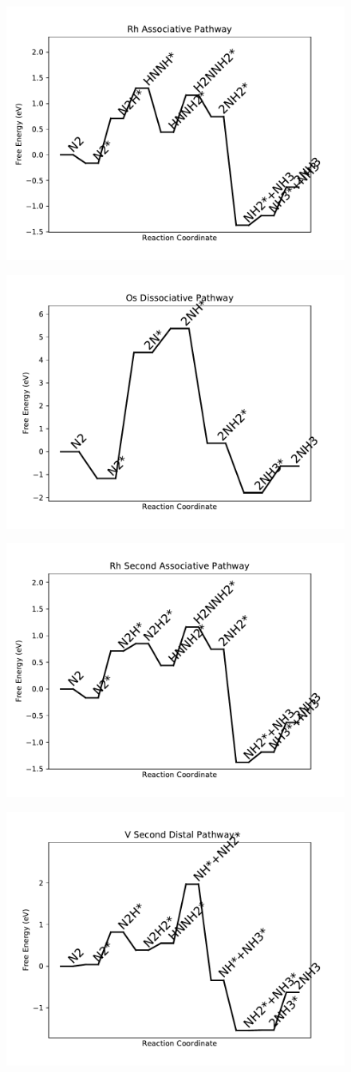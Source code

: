 \begin{figure}
\includegraphics[width=0.5\linewidth]{data/plots/Rh_associative.pdf}
\label{fig:Rh_associative}
\end{figure}

\begin{figure}
\includegraphics[width=0.5\linewidth]{data/plots/Os_dissociative.pdf}
\label{fig:Os_dissociative}
\end{figure}

\begin{figure}
\includegraphics[width=0.5\linewidth]{data/plots/Rh_associative_2.pdf}
\label{fig:Rh_associative_2}
\end{figure}

\begin{figure}
\includegraphics[width=0.5\linewidth]{data/plots/V_distal_2.pdf}
\label{fig:V_distal_2}
\end{figure}

